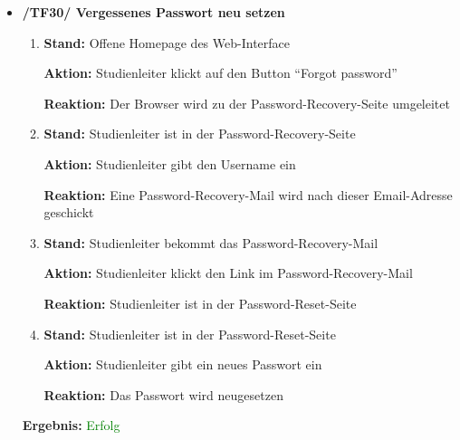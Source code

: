 \documentclass[a4paper]{scrreprt}
\begin{document}
\begin{itemize}
                            \item \textbf{/TF30/ Vergessenes Passwort neu setzen}
                                \begin{enumerate}
                                    \item \par \textbf{Stand: }Offene Homepage des Web-Interface
                                        \par \textbf{Aktion: }Studienleiter klickt auf den Button ``Forgot password''
                                        \par \textbf{Reaktion: }Der Browser wird zu der Password-Recovery-Seite umgeleitet
                                    \item \par \textbf{Stand: }Studienleiter ist in der Password-Recovery-Seite
                                        \par \textbf{Aktion: }Studienleiter gibt den Username ein
                                        \par \textbf{Reaktion: }Eine Password-Recovery-Mail wird nach dieser Email-Adresse geschickt
                                    \item \par \textbf{Stand: }Studienleiter bekommt das Password-Recovery-Mail
                                        \par \textbf{Aktion: }Studienleiter klickt den Link im Password-Recovery-Mail
                                        \par \textbf{Reaktion: }Studienleiter ist in der Password-Reset-Seite
                                    \item \par \textbf{Stand: }Studienleiter ist in der Password-Reset-Seite
                                        \par \textbf{Aktion: }Studienleiter gibt ein neues Passwort ein
                                        \par \textbf{Reaktion: }Das Passwort wird neugesetzen
                                \end{enumerate}
                                \vspace*{0.3cm}
                                \par \textbf{Ergebnis: }\textcolor{green}{Erfolg}
                                \vspace*{0.6cm}
		      		

\end{itemize}
\end{document}
